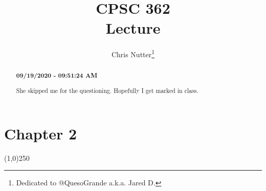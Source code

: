 \documentclass[12pt,a4paper]{article}
\title{\Large{CPSC 362}\\\LARGE\textbf{{Lecture}}}
\author{Chris Nutter\thanks{Dedicated to @QuesoGrande a.k.a. Jared D.}}
\begin{document}
\maketitle

\begin{abstract}
    \noindent
    \begin{center}\textbf{09/19/2020 - 09:51:24 AM}\end{center}
        She skipped me for the questioning. Hopefully I get marked in class. 
\end{abstract}

\tableofcontents    


\section{Chapter 2}
    \begin{center}\line(1,0){250}\end{center}

\end{document}

